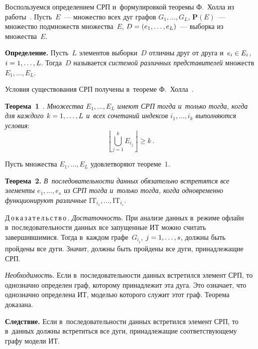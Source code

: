 \begin{multicols}{2}
  Воспользуемся определением СРП и~формулировкой теоремы Ф.~Холла из 
работы~\cite{12-gt}. Пусть~$E$~--- множество всех дуг графов $G_1,\ldots , G_L$, 
$\mathbf{P}(E)$~--- множество подмножеств множества~$E$, $D\hm= (e_1,\ldots 
,e_L)$~--- выборка из множества~$E$.
  
  \smallskip
  
  \noindent
  \textbf{Определение.} Пусть~$L$ элементов выборки~$D$ отличны друг от 
друга и~$e_i\hm\in E_i$, $i\hm=1,\ldots , L$. Тогда~$D$ называется \textit{системой 
различных представителей} множеств $E_1,\ldots , E_L$. 
  
  \smallskip
  
  Условия существования СРП получены в~теореме Ф.~Холла~\cite{12-gt}.
  
  \smallskip
  
  \noindent
  \textbf{Теорема~1}~\cite{12-gt}. \textit{Множества $E_1,\ldots , E_L$ имеют 
СРП тогда и~только тогда, когда для каждого $k\hm=1,\ldots , L$ и~всех 
сочетаний индексов $i_1,\ldots , i_k$ выполняются условия}:
  $$
  \left\lfloor  \bigcup\limits_{j=1}^k E_{i_j}\right\rfloor \geq k\,.
  $$
  
  Пусть множества $E_1, \ldots , E_L$ удовлетворяют тео\-ре\-ме~1. 
  
  \smallskip
  
  \noindent
  \textbf{Теорема~2.} \textit{В~последовательности данных обязательно 
встретятся все элементы $e_1,\ldots , e_s$ из СРП тогда и~только тогда, когда 
одновременно функционируют различные} $\mathrm{IT}_{i_1}, \ldots , \mathrm{IT}_{i_s}$.
  
  \smallskip
  
  \noindent
  Д\,о\,к\,а\,з\,а\,т\,е\,л\,ь\,с\,т\,в\,о\,. \textit{Достаточность}. При анализе данных 
в~режиме офлайн в~последовательности данных все запущенные ИТ можно 
считать завершившимися. Тогда в~каждом графе~$G_{i_j}$, $j\hm=1, \ldots , s$, 
должны быть пройдены все дуги. Значит, должны быть пройдены все дуги, 
принадлежащие СРП. 
  
  \textit{Необходимость}. Если в~последовательности данных встретился элемент 
СРП, то однозначно определен граф, которому принадлежит эта дуга. Это 
означает, что однозначно определена ИТ, моделью которого служит этот граф. 
Теорема доказана.
  
  \smallskip
  
  \noindent
  \textbf{Следствие.} Если в~последовательности данных встретился элемент 
СРП, то в~данных должны встретиться все дуги, принадлежащие 
соответствующему графу модели ИТ. 
  

\end{multicols}
